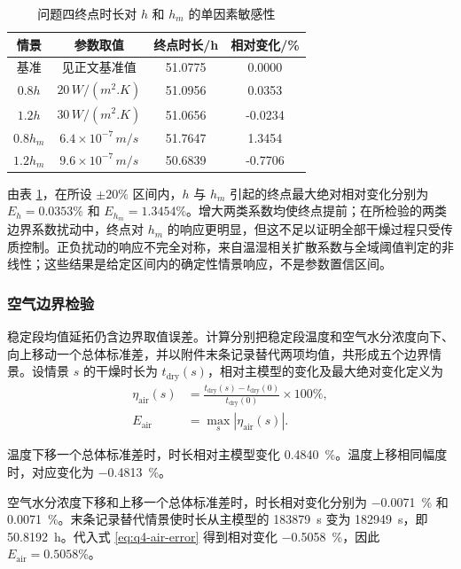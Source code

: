 \documentclass[withoutpreface,bwprint]{cumcmthesis}
\begin{document}
\begin{table}[htbp]
\centering
\caption{问题四终点时长对 \(h\) 和 \(h_m\) 的单因素敏感性}
\label{tab:q4-transfer-sensitivity}
\small
\begin{tabular}{cccc}
\toprule
情景 & 参数取值 & 终点时长/\si{h} & 相对变化/\si{\percent}\\
\midrule
基准 & 见正文基准值 & 51.0775 & 0.0000\\
\(0.8h\) & \(20\,\si{W/(m^2.K)}\) & 51.0956 & 0.0353\\
\(1.2h\) & \(30\,\si{W/(m^2.K)}\) & 51.0656 & -0.0234\\
\(0.8h_m\) & \(6.4\times10^{-7}\,\si{m/s}\) & 51.7647 & 1.3454\\
\(1.2h_m\) & \(9.6\times10^{-7}\,\si{m/s}\) & 50.6839 & -0.7706\\
\bottomrule
\end{tabular}
\end{table}

由表 \ref{tab:q4-transfer-sensitivity}，在所设 \(\pm20\%\) 区间内，\(h\) 与 \(h_m\) 引起的终点最大绝对相对变化分别为 \(E_h=0.0353\%\) 和 \(E_{h_m}=1.3454\%\)。增大两类系数均使终点提前；在所检验的两类边界系数扰动中，终点对 \(h_m\) 的响应更明显，但这不足以证明全部干燥过程只受传质控制。正负扰动的响应不完全对称，来自温湿相关扩散系数与全域阈值判定的非线性；这些结果是给定区间内的确定性情景响应，不是参数置信区间。

\subsubsection{空气边界检验}

稳定段均值延拓仍含边界取值误差。计算分别把稳定段温度和空气水分浓度向下、向上移动一个总体标准差，并以附件末条记录替代两项均值，共形成五个边界情景。设情景 \(s\) 的干燥时长为 \(t_{\mathrm{dry}}(s)\)，相对主模型的变化及最大绝对变化定义为
\begin{align}
\eta_{\mathrm{air}}(s)
&=\frac{t_{\mathrm{dry}}(s)-t_{\mathrm{dry}}(0)}
{t_{\mathrm{dry}}(0)}\times100\%,\\
E_{\mathrm{air}}
&=\max_s\left|\eta_{\mathrm{air}}(s)\right|.
\label{eq:q4-air-error}
\end{align}

温度下移一个总体标准差时，时长相对主模型变化 \SI{0.4840}{\percent}。温度上移相同幅度时，对应变化为 \SI{-0.4813}{\percent}。

空气水分浓度下移和上移一个总体标准差时，时长相对变化分别为 \SI{-0.0071}{\percent} 和 \SI{0.0071}{\percent}。末条记录替代情景使时长从主模型的 \SI{183879}{s} 变为 \SI{182949}{s}，即 \SI{50.8192}{h}。代入式 \ref{eq:q4-air-error} 得到相对变化 \SI{-0.5058}{\percent}，因此 \(E_{\mathrm{air}}=0.5058\%\)。
\end{document}
